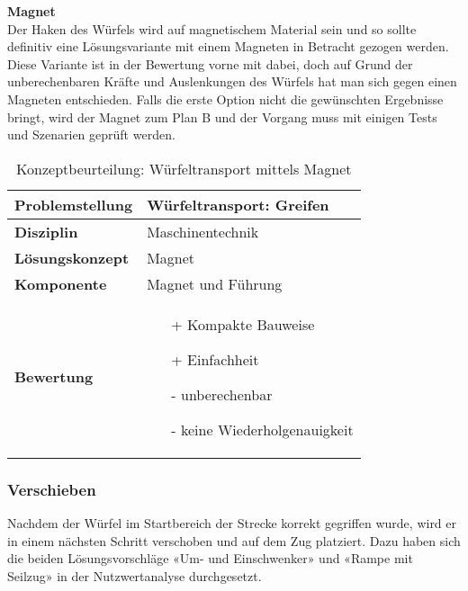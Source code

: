 \documentclass[../../main.tex]{subfiles}
\begin{document}
    \textbf{Magnet}\\
     Der Haken des Würfels wird auf magnetischem Material sein und so sollte definitiv eine Lösungsvariante mit einem Magneten in Betracht gezogen werden. Diese Variante ist in der Bewertung vorne mit dabei, doch auf Grund der unberechenbaren Kräfte und Auslenkungen des Würfels hat man sich gegen einen Magneten entschieden. Falls die erste Option nicht die gewünschten Ergebnisse bringt, wird der Magnet zum Plan B und der Vorgang muss mit einigen Tests und Szenarien geprüft werden. \\

     \begin{flushleft}
        \begin{table}[h]
        \begin{tabular}{ | l | p{11cm} |}
        \hline
        \textbf{Problemstellung} & Würfeltransport: Greifen \\ \hline
        \textbf{Disziplin} & Maschinentechnik \\ \hline
        \textbf{Lösungskonzept} &  Magnet \\ \hline
        \textbf{Komponente} & Magnet und Führung \\ \hline
        \textbf{Bewertung} &  \begin{itemize}
                                \item[+] Kompakte Bauweise
                                \item[+] Einfachheit
                                \item[-] unberechenbar 
                                \item[-] keine Wiederholgenauigkeit
                              \end{itemize} \\ \hline
        \end{tabular}
        \caption{Konzeptbeurteilung: Würfeltransport mittels Magnet}
        \label{tab:konzept_wurfeltrransport_magnet}
    \end{table}
    \end{flushleft}
    \subsubsection{Verschieben}
    Nachdem der Würfel im Startbereich der Strecke korrekt gegriffen wurde, wird er in einem nächsten Schritt verschoben und auf dem Zug platziert. Dazu haben sich die beiden Lösungsvorschläge «Um- und Einschwenker» und «Rampe mit Seilzug» in der Nutzwertanalyse durchgesetzt.\\
\end{document}
